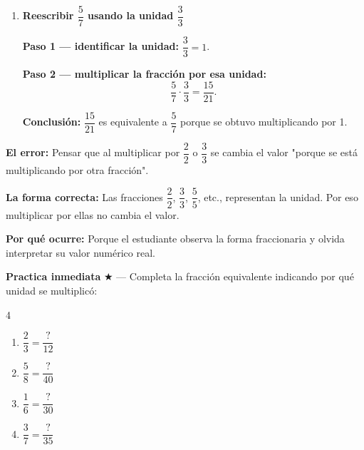 \documentclass[11pt, letterpaper]{article}
\begin{document}
\begin{tcolorbox}[examplebox, title={Ejemplo --- Reescribir una fracci\'on usando multiplicaci\'on por 1}]
\begin{enumerate}[label=\textbf{Ej. \arabic*.}, leftmargin=*, itemsep=14pt]

\item \textbf{Reescribir $\dfrac{5}{7}$ usando la unidad $\dfrac{3}{3}$}

\textbf{Paso 1 --- identificar la unidad:}
$\dfrac{3}{3}=1$.

\medskip
\textbf{Paso 2 --- multiplicar la fracci\'on por esa unidad:}
$$\frac{5}{7}\cdot\frac{3}{3}=\frac{15}{21}.$$

\medskip
\textbf{Conclusi\'on:}
$\dfrac{15}{21}$ es equivalente a $\dfrac{5}{7}$ porque se obtuvo multiplicando por 1.

\end{enumerate}
\end{tcolorbox}

\begin{tcolorbox}[warningbox, title={Error frecuente --- Ver $\dfrac{k}{k}$ como una fracci\'on "nueva"}]
\noindent\textbf{El error:}
Pensar que al multiplicar por $\dfrac{2}{2}$ o $\dfrac{3}{3}$ se cambia el valor "porque se est\'a multiplicando por otra fracci\'on".

\medskip
\noindent\textbf{La forma correcta:}
Las fracciones $\dfrac{2}{2}$, $\dfrac{3}{3}$, $\dfrac{5}{5}$, etc., representan la unidad. Por eso multiplicar por ellas no cambia el valor.

\medskip
\noindent\textbf{Por qu\'e ocurre:}
Porque el estudiante observa la forma fraccionaria y olvida interpretar su valor num\'erico real.
\end{tcolorbox}

\medskip
\textbf{Practica inmediata} \quad $\bigstar$ --- Completa la fracci\'on equivalente indicando por qu\'e unidad se multiplic\'o:
\begin{multicols}{4}
\begin{enumerate}[label=\alph*), leftmargin=*]
  \item $\dfrac{2}{3} = \dfrac{?}{12}$
  \item $\dfrac{5}{8} = \dfrac{?}{40}$
  \item $\dfrac{1}{6} = \dfrac{?}{30}$
  \item $\dfrac{3}{7} = \dfrac{?}{35}$
\end{enumerate}
\end{multicols}
\end{document}
